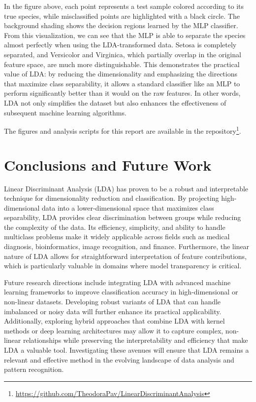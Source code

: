 \documentclass[12pt,a4paper]{article}
\begin{document}
In the figure above, each point represents a test sample colored according to its true species, while misclassified points are highlighted with a black circle. The background shading shows the decision regions learned by the MLP classifier. From this visualization, we can see that the MLP is able to separate the species almost perfectly when using the LDA-transformed data. Setosa is completely separated, and Versicolor and Virginica, which partially overlap in the original feature space, are much more distinguishable. This demonstrates the practical value of LDA: by reducing the dimensionality and emphasizing the directions that maximize class separability, it allows a standard classifier like an MLP to perform significantly better than it would on the raw features. In other words, LDA not only simplifies the dataset but also enhances the effectiveness of subsequent machine learning algorithms.

The figures and analysis scripts for this report are available in the repository\footnote{\url{https://github.com/TheodoraPav/LinearDiscriminantAnalysis}}.


\section{Conclusions and Future Work}

Linear Discriminant Analysis (LDA) has proven to be a robust and interpretable technique for dimensionality reduction and classification. By projecting high-dimensional data into a lower-dimensional space that maximizes class separability, LDA provides clear discrimination between groups while reducing the complexity of the data. Its efficiency, simplicity, and ability to handle multiclass problems make it widely applicable across fields such as medical diagnosis, bioinformatics, image recognition, and finance. Furthermore, the linear nature of LDA allows for straightforward interpretation of feature contributions, which is particularly valuable in domains where model transparency is critical.

Future research directions include integrating LDA with advanced machine learning frameworks to improve classification accuracy in high-dimensional or non-linear datasets. Developing robust variants of LDA that can handle imbalanced or noisy data will further enhance its practical applicability. Additionally, exploring hybrid approaches that combine LDA with kernel methods or deep learning architectures may allow it to capture complex, non-linear relationships while preserving the interpretability and efficiency that make LDA a valuable tool. Investigating these avenues will ensure that LDA remains a relevant and effective method in the evolving landscape of data analysis and pattern recognition.
\end{document}
